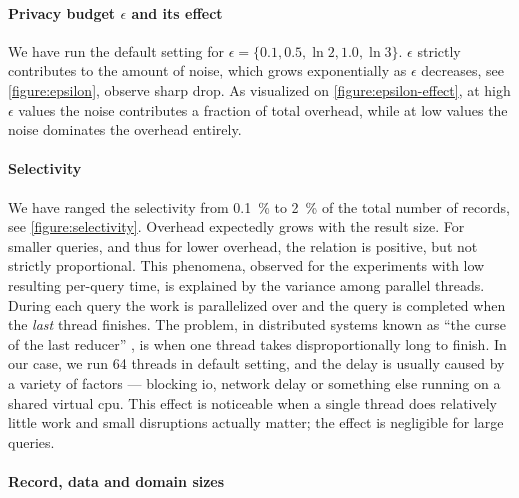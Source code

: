 			\paragraph*{Privacy budget \texorpdfstring{$\epsilon$}{epsilon} and its effect}

				We have run the default setting for $\epsilon = \{ 0.1, \allowbreak 0.5, \allowbreak \ln{2}, \allowbreak 1.0, \allowbreak \ln{3} \}$.
				$\epsilon$ strictly contributes to the amount of noise, which grows exponentially as $\epsilon$ decreases, see \cref{figure:epsilon}, observe sharp drop.
				As visualized on \cref{figure:epsilon-effect}, at high $\epsilon$ values the noise contributes a fraction of total overhead, while at low values the noise dominates the overhead entirely.

			

			\paragraph*{Selectivity}

				We have ranged the selectivity from \SI{0.1}{\percent} to \SI{2}{\percent} of the total number of records, see \cref{figure:selectivity}.
				Overhead expectedly grows with the result size.
				For smaller queries, and thus for lower overhead, the relation is positive, but not strictly proportional.
				This phenomena, observed for the experiments with low resulting per-query time, is explained by the variance among parallel threads.
				During each query the work is parallelized over \oramsNumber{}  and the query is completed when the \emph{last} thread finishes.
				The problem, in distributed systems known as ``the curse of the last reducer'' \cite{curse-of-last-reducer}, is when one thread takes disproportionally long to finish.
				In our case, we run 64 threads in default setting, and the delay is usually caused by a variety of factors --- blocking \acrshort{io}, network delay or something else running on a shared virtual \acrshort{cpu}.
				This effect is noticeable when a single thread does relatively little work and small disruptions actually matter; the effect is negligible for large queries.

			

			\paragraph*{Record, data and domain sizes}

